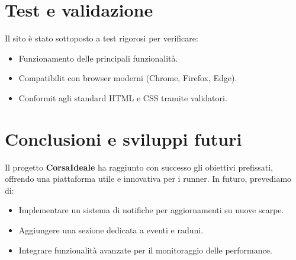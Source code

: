 \documentclass[a4paper, 12pt]{article}
\begin{document}
\begin{justify}
\section{Test e validazione}

Il sito è stato sottoposto a test rigorosi per verificare:
\begin{itemize}
    \item Funzionamento delle principali funzionalità.
    \item Compatibilit con browser moderni (Chrome, Firefox, Edge).
    \item Conformit agli standard HTML e CSS tramite validatori.
\end{itemize}

\section{Conclusioni e sviluppi futuri}

Il progetto \textbf{CorsaIdeale} ha raggiunto con successo gli obiettivi prefissati, offrendo una piattaforma utile e innovativa per i runner. In futuro, prevediamo di:
\begin{itemize}
    \item Implementare un sistema di notifiche per aggiornamenti su nuove scarpe.
    \item Aggiungere una sezione dedicata a eventi e raduni.
    \item Integrare funzionalit\`a avanzate per il monitoraggio delle performance.
\end{itemize}

\vspace{1cm}


\end{justify}
\end{document}
